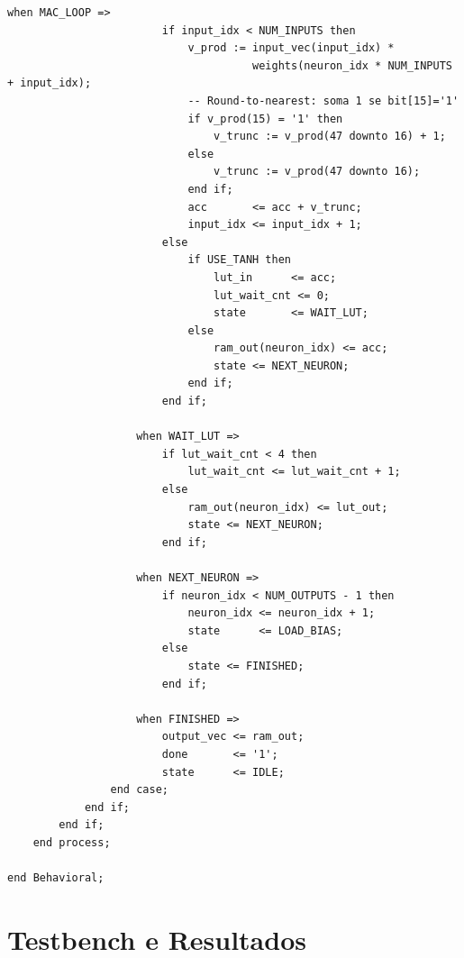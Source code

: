 \documentclass[a4paper,12pt]{article}
\begin{document}
\begin{lstlisting}[style=vhdlstyle,
    caption={C\'odigo VHDL do \texttt{Dense\_Layer}.},
    label={lst:dense}]
                    when MAC_LOOP =>
                        if input_idx < NUM_INPUTS then
                            v_prod := input_vec(input_idx) *
                                      weights(neuron_idx * NUM_INPUTS + input_idx);
                            -- Round-to-nearest: soma 1 se bit[15]='1'
                            if v_prod(15) = '1' then
                                v_trunc := v_prod(47 downto 16) + 1;
                            else
                                v_trunc := v_prod(47 downto 16);
                            end if;
                            acc       <= acc + v_trunc;
                            input_idx <= input_idx + 1;
                        else
                            if USE_TANH then
                                lut_in      <= acc;
                                lut_wait_cnt <= 0;
                                state       <= WAIT_LUT;
                            else
                                ram_out(neuron_idx) <= acc;
                                state <= NEXT_NEURON;
                            end if;
                        end if;

                    when WAIT_LUT =>
                        if lut_wait_cnt < 4 then
                            lut_wait_cnt <= lut_wait_cnt + 1;
                        else
                            ram_out(neuron_idx) <= lut_out;
                            state <= NEXT_NEURON;
                        end if;

                    when NEXT_NEURON =>
                        if neuron_idx < NUM_OUTPUTS - 1 then
                            neuron_idx <= neuron_idx + 1;
                            state      <= LOAD_BIAS;
                        else
                            state <= FINISHED;
                        end if;

                    when FINISHED =>
                        output_vec <= ram_out;
                        done       <= '1';
                        state      <= IDLE;
                end case;
            end if;
        end if;
    end process;

end Behavioral;
\end{lstlisting}


\section{Testbench e Resultados}
\end{document}
